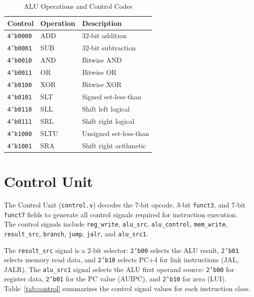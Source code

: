 \documentclass[12pt,a4paper]{report}
\begin{document}
\begin{table}[h!]
\centering
\caption{ALU Operations and Control Codes}
\label{tab:aluops}
\begin{tabular}{C{2.4cm} L{3.6cm} L{5.4cm}}
    \toprule
    \textbf{Control} & \textbf{Operation} & \textbf{Description} \\
    \midrule
    \texttt{4'b0000} & ADD  & 32-bit addition \\
    \texttt{4'b0001} & SUB  & 32-bit subtraction \\
    \texttt{4'b0010} & AND  & Bitwise AND \\
    \texttt{4'b0011} & OR   & Bitwise OR \\
    \texttt{4'b0100} & XOR  & Bitwise XOR \\
    \texttt{4'b0101} & SLT  & Signed set-less-than \\
    \texttt{4'b0110} & SLL  & Shift left logical \\
    \texttt{4'b0111} & SRL  & Shift right logical \\
    \texttt{4'b1000} & SLTU & Unsigned set-less-than \\
    \texttt{4'b1001} & SRA  & Shift right arithmetic \\
    \bottomrule
\end{tabular}
\end{table}

\section{Control Unit}
The Control Unit (\texttt{control.v}) decodes the 7-bit opcode, 3-bit \texttt{funct3},
and 7-bit \texttt{funct7} fields to generate all control signals required for
instruction execution. The control signals include \texttt{reg\_write},
\texttt{alu\_src}, \texttt{alu\_control}, \texttt{mem\_write}, \texttt{result\_src},
\texttt{branch}, \texttt{jump}, \texttt{jalr}, and \texttt{alu\_src1}.

The \texttt{result\_src} signal is a 2-bit selector: \texttt{2'b00} selects the ALU
result, \texttt{2'b01} selects memory read data, and \texttt{2'b10} selects PC+4 for
link instructions (JAL, JALR). The \texttt{alu\_src1} signal selects the ALU first
operand source: \texttt{2'b00} for register data, \texttt{2'b01} for the PC value
(AUIPC), and \texttt{2'b10} for zero (LUI). Table~\ref{tab:control} summarizes the
control signal values for each instruction class.
\end{document}
